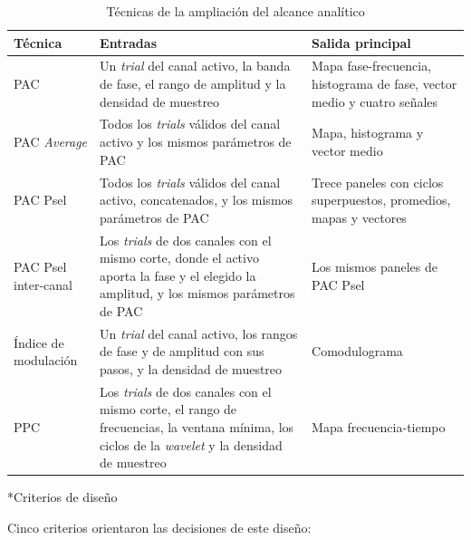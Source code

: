 \documentclass[12pt,letterpaper,oneside]{article}
\makeatletter
\newcommand{\subsubsubsection}[1]{%
  \@startsection{paragraph}{4}{\z@}{10pt plus 2pt minus 1pt}{4pt}%
    {\normalfont\normalsize\bfseries\itshape}*{#1}}
\makeatother
\begin{document}
\begin{table}[H]
  \centering
  \small{}
  \renewcommand{\arraystretch}{1.15}
  \begin{tabular}{|>{\raggedright\arraybackslash}p{2.6cm}|>{\raggedright\arraybackslash}p{6.6cm}|>{\raggedright\arraybackslash}p{5.0cm}|}
    \hline
    \textbf{Técnica} & \textbf{Entradas} & \textbf{Salida principal} \\ \hline
    PAC & Un \textit{trial} del canal activo, la banda de fase, el rango de amplitud y la densidad de muestreo & Mapa fase-frecuencia, histograma de fase, vector medio y cuatro señales \\ \hline
    PAC \textit{Average} & Todos los \textit{trials} válidos del canal activo y los mismos parámetros de PAC & Mapa, histograma y vector medio \\ \hline
    PAC Psel & Todos los \textit{trials} válidos del canal activo, concatenados, y los mismos parámetros de PAC & Trece paneles con ciclos superpuestos, promedios, mapas y vectores \\ \hline
    PAC Psel inter-canal & Los \textit{trials} de dos canales con el mismo corte, donde el activo aporta la fase y el elegido la amplitud, y los mismos parámetros de PAC & Los mismos paneles de PAC Psel \\ \hline
    Índice de modulación & Un \textit{trial} del canal activo, los rangos de fase y de amplitud con sus pasos, y la densidad de muestreo & Comodulograma \\ \hline
    PPC & Los \textit{trials} de dos canales con el mismo corte, el rango de frecuencias, la ventana mínima, los ciclos de la \textit{wavelet} y la densidad de muestreo & Mapa frecuencia-tiempo \\ \hline
  \end{tabular}
\caption{Técnicas de la ampliación del alcance analítico}
\label{tab:tecnicas}
\end{table}

\subsubsubsection{Criterios de diseño}

Cinco criterios orientaron las decisiones de este diseño:
\end{document}
